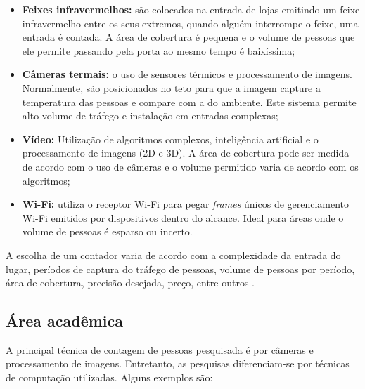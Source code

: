 \begin{itemize}
  \item \textbf{Feixes infravermelhos:} são colocados
na entrada de lojas emitindo um feixe infravermelho entre os seus extremos,
quando alguém interrompe o feixe, uma entrada é contada. A área de cobertura é
pequena e o volume de pessoas que ele permite passando pela porta ao mesmo
tempo é baixíssima;
  \item \textbf{Câmeras termais:} o uso de sensores térmicos e
processamento de imagens. Normalmente,
são posicionados no teto para que a imagem capture a temperatura das pessoas
e compare com a do ambiente. Este sistema permite alto volume de tráfego e instalação em entradas complexas;
  \item \textbf{Vídeo:} Utilização de algoritmos complexos, inteligência artificial
   e o processamento de imagens (2D e 3D). A área de cobertura
  pode ser medida de acordo com o uso de câmeras e o volume permitido varia de acordo com os algoritmos;
  \item \textbf{Wi-Fi:} utiliza o receptor Wi-Fi para pegar \emph{frames} únicos de gerenciamento Wi-Fi emitidos por dispositivos
  dentro do alcance. Ideal para áreas onde o volume de pessoas é esparso ou incerto.
\end{itemize}

A escolha de um contador varia de acordo com a complexidade da entrada do lugar, períodos de captura do tráfego de pessoas,
volume de pessoas por período, área de cobertura, precisão desejada, preço, entre outros \cite{trafsys} \cite{Axper2017}.

\subsection{Área acadêmica}
A principal técnica de contagem de pessoas pesquisada é por câmeras e processamento de imagens. Entretanto,
as pesquisas diferenciam-se por técnicas de computação utilizadas. Alguns exemplos são:

